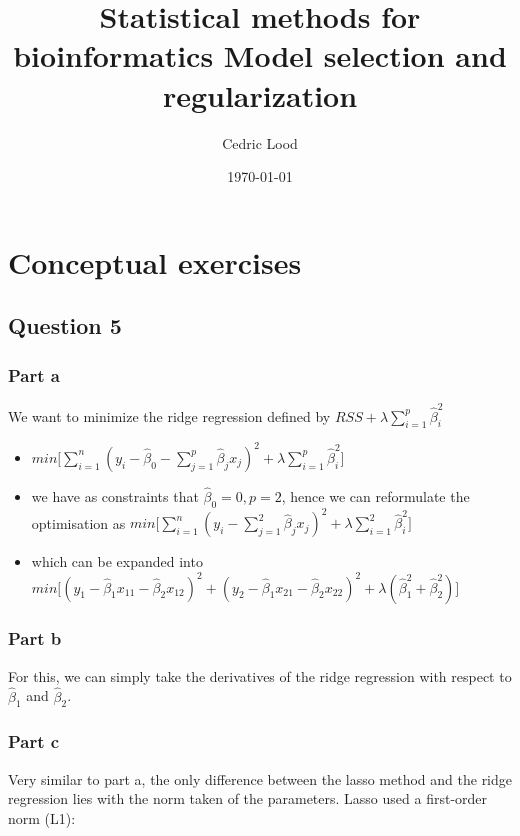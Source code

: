 \documentclass[11pt, a4paper]{article}
\title{Statistical methods for bioinformatics \linebreak Model selection and regularization}
\author{Cedric Lood}
\date{\today}
\begin{document}
\maketitle


\graphicspath{ {figures/} }
\setlength{\droptitle}{-5em} 
\setlength{\parindent}{0cm}

\section{Conceptual exercises}
\label{sec-1}
\subsection{Question 5}
\label{sec-1-1}
\subsubsection{Part a}
\label{sec-1-1-1}

We want to minimize the ridge regression defined by $RSS + \lambda \sum\limits_{i=1}^p \hat{\beta}_i^2$

\begin{itemize}
\item $min\Big[\sum\limits_{i=1}^n {(y_i - \hat{\beta}_0 - \sum\limits_{j=1}^p {\hat{\beta}_jx_j} )^2} + \lambda \sum\limits_{i=1}^p \hat{\beta}_i^2\Big]$
\item we have as constraints that $\hat{\beta}_0 = 0, p=2$, hence we can
  reformulate the optimisation as $min\Big[\sum\limits_{i=1}^n {(y_i - \sum\limits_{j=1}^2 {\hat{\beta}_jx_j} )^2} + \lambda \sum\limits_{i=1}^2 \hat{\beta}_i^2\Big]$
\item which can be expanded into $min\Big[ (y_1 - \hat{\beta}_1x_{11} - \hat{\beta}_2x_{12})^2 + (y_2 - \hat{\beta}_1x_{21} - \hat{\beta}_2x_{22})^2 + \lambda (\hat{\beta}_1^2 + \hat{\beta}_2^2)\Big]$
\end{itemize}
\subsubsection{Part b}
\label{sec-1-1-2}

For this, we can simply take the derivatives of the ridge regression
with respect to $\hat{\beta}_1$ and $\hat{\beta}_2$.
\subsubsection{Part c}
\label{sec-1-1-3}

Very similar to part a, the only difference between the lasso method
and the ridge regression lies with the norm taken of the
parameters. Lasso used a first-order norm (L1):
\end{document}
